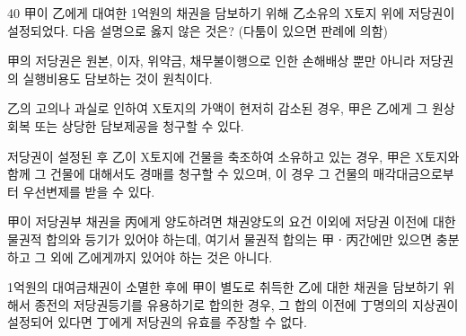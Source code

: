 \begin{question}{40}
甲이 乙에게 대여한 1억원의 채권을 담보하기 위해 乙소유의 X토지 위에 저당권이 설정되었다. 다음 설명으로 옳지 않은 것은? (다툼이 있으면 판례에 의함)
\begin{choices}
  \item 甲의 저당권은 원본, 이자, 위약금, 채무불이행으로 인한 손해배상 뿐만 아니라 저당권의 실행비용도 담보하는 것이 원칙이다.
  \item 乙의 고의나 과실로 인하여 X토지의 가액이 현저히 감소된 경우, 甲은 乙에게 그 원상회복 또는 상당한 담보제공을 청구할 수 있다.
  \item 저당권이 설정된 후 乙이 X토지에 건물을 축조하여 소유하고 있는 경우, 甲은 X토지와 함께 그 건물에 대해서도 경매를 청구할 수 있으며, 이 경우 그 건물의 매각대금으로부터 우선변제를 받을 수 있다.
  \item 甲이 저당권부 채권을 丙에게 양도하려면 채권양도의 요건 이외에 저당권 이전에 대한 물권적 합의와 등기가 있어야 하는데, 여기서 물권적 합의는 甲ㆍ丙간에만 있으면 충분하고 그 외에 乙에게까지 있어야 하는 것은 아니다.
  \item 1억원의 대여금채권이 소멸한 후에 甲이 별도로 취득한 乙에 대한 채권을 담보하기 위해서 종전의 저당권등기를 유용하기로 합의한 경우, 그 합의 이전에 丁명의의 지상권이 설정되어 있다면 丁에게 저당권의 유효를 주장할 수 없다.
\end{choices}
\end{question}
